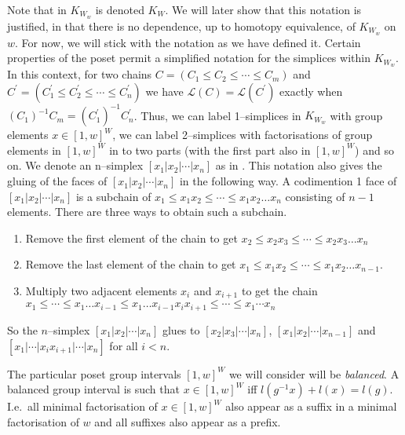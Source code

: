 \documentclass[class=article, crop=false]{standalone}
\begin{document}
Note that in \cite{paolini_salvetti_kpi1_2021}  $K_{W_w}$ is denoted $K_W$. We will later show that this notation is justified, in that there is no dependence, up to homotopy equivalence, of $K_{W_w}$ on $w$. For now, we will stick with the notation as we have defined it.
Certain properties of the poset permit a simplified notation for the simplices within $K_{W_w}$. In this context, for two chains $C=(C_1 \leq C_2 \leq \cdots \leq C_m)$ and $C^\prime = (C_1^\prime \leq C_2^\prime \leq \cdots \leq C_n^\prime)$ we have $\mathcal{L}(C) = \mathcal{L}(C^\prime)$ exactly when $(C_1)^{-1}C_m = (C_1^\prime)^{-1}C_n^\prime$. Thus, we can label 1--simplices in $K_{W_w}$ with group elements $x \in [1,w]^W$, we can label 2--simplices with factorisations of group elements in $[1,w]^W$ in to two parts (with the first part also in $[1,w]^W$) and so on. We denote an n--simplex $[x_1 | x_2 | \cdots | x_n]$ as in \cite[Definition 2.8]{paolini_salvetti_kpi1_2021}. This notation also gives the gluing of the faces of $[x_1 | x_2 | \cdots | x_n]$ in the following way. A codimention 1 face of $[x_1 | x_2 | \cdots | x_n]$ is a subchain of $x_1 \leq x_1x_2 \leq \cdots \leq x_1x_2\ldots x_n$ consisting of $n-1$ elements. There are three ways to obtain such a subchain.
\begin{enumerate}
    \item \label{item:gluing_step_1} Remove the first element of the chain to get $x_2 \leq x_2x_3 \leq \cdots \leq x_2x_3\ldots x_n$
    \item \label{item:gluing_step_2} Remove the last element of the chain to get $x_1 \leq x_1x_2 \leq \cdots \leq x_1x_2\ldots x_{n-1}$.
    \item \label{item:gluing_step_3} Multiply two adjacent elements $x_i$ and $x_{i+1}$ to get the chain $x_1 \leq \cdots \leq x_1 \ldots x_{i-1} \leq x_1 \ldots x_{i-1}x_ix_{i+1} \leq \cdots \leq x_1\cdots x_n$ 
\end{enumerate}

So the $n$--simplex $[x_1 | x_2 | \cdots | x_n]$ glues to $[x_2|x_3|\cdots|x_n]$, $[x_1|x_2|\cdots|x_{n-1}]$ and $[x_1| \cdots | x_ix_{i+1} | \cdots |x_n]$ for all $i<n$.

The particular poset group intervals $[1,w]^W$ we will consider will be \emph{balanced}. A balanced group interval is such that  $x \in [1,w]^W$ iff $l(g^{-1}x) + l(x) = l(g)$. I.e.~all minimal factorisation of $x \in [1,w]^W$ also appear as a suffix in a minimal factorisation of $w$ and all suffixes also appear as a prefix.
\end{document}
